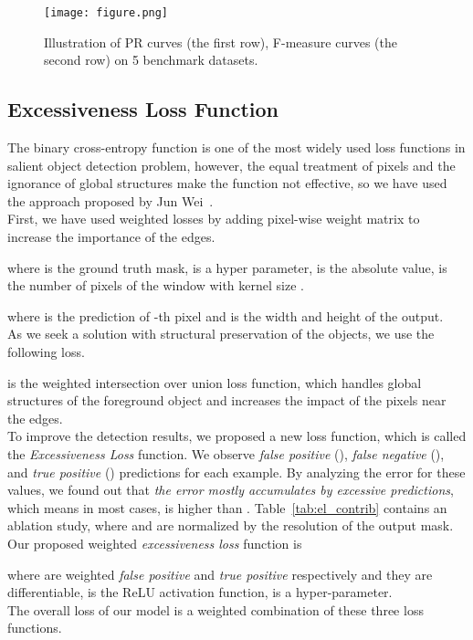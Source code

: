 \documentclass[10pt,twocolumn,letterpaper]{article}
\begin{document}
\begin{figure*}[t]
\begin{center}
\texttt{[image: figure.png]}
\end{center}
   \caption{Illustration of PR curves (the first row), F-measure curves (the second row) on 5 benchmark datasets.}
\label{fig:pr_curve}
\end{figure*}

\subsection{Excessiveness Loss Function}
The binary cross-entropy function is one of the most widely used loss functions in salient object detection problem, however, the equal treatment of pixels and the ignorance of global structures make the function not effective, so we have used the approach proposed by Jun Wei~\etal\cite{F3Net}. \\
First, we have used weighted losses by adding pixel-wise weight matrix to increase the importance of the edges.


where  is the ground truth mask,  is a hyper parameter,  is the absolute value,  is the number of pixels of the window with kernel size .



where  is the prediction of -th pixel and  is the width and height of the output. \\
As we seek a solution with structural preservation of the objects, we use the following loss.  

 is the weighted intersection over union loss function, which handles global structures of the foreground object and increases the impact of the pixels near the edges.\\
To improve the detection results, we proposed a new loss function, which is called the  \textit{Excessiveness Loss} function. We observe \textit{false positive} (), \textit{false negative} (), and \textit{true positive} () predictions for each example. By analyzing the error for these values, we found out that \textit{the error mostly accumulates by excessive predictions}, which means in most cases,
 is higher than . Table~\ref{tab:el_contrib} contains an ablation study, where  and  are normalized by the resolution of the output mask. Our proposed weighted \textit{excessiveness loss} function is


where  are weighted \textit{false positive} and \textit{true positive} respectively and they are differentiable,  is the ReLU activation function,  is a hyper-parameter.  \\
The overall loss of our model is a weighted combination of these three loss functions.
\end{document}
